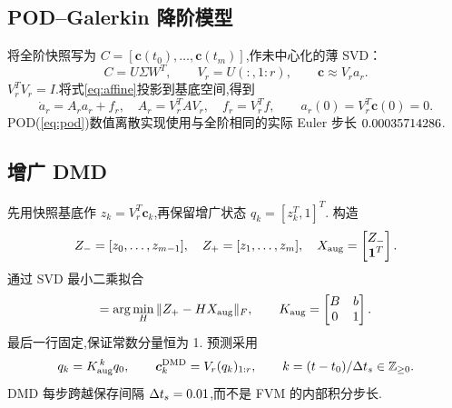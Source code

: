 \documentclass[UTF8,a4paper,11pt,fontset=fandol]{ctexart}
\makeatletter
\numberwithin{equation}{section}
\let\TableInput\@@input
\newcommand{\cc}{\bm{c}}
\makeatother
\begin{document}
\subsection{POD--Galerkin 降阶模型}
将全阶快照写为 $C=[\cc(t_0),\ldots,\cc(t_m)]$,作未中心化的薄 SVD：
\begin{equation}
 C=U\Sigma W^T,\qquad V_r=U(:,1:r),\qquad \cc\approx V_r a_r.
\end{equation}
$V_r^TV_r=I$.将式\eqref{eq:affine}投影到基底空间,得到
\begin{equation}\label{eq:pod}
 \dot a_r=A_r a_r+f_r,\quad A_r=V_r^TAV_r,\quad f_r=V_r^Tf,
 \qquad a_r(0)=V_r^T\cc(0)=0.
\end{equation}
POD(\ref{eq:pod})数值离散实现使用与全阶相同的实际 Euler 步长 $0.00035714286$.


\subsection{增广 DMD}
先用快照基底作 $z_k=V_r^T\cc_k$,再保留增广状态
$q_k=[z_k^T,1]^T$.
构造
\begin{equation}
 Z_-=[z_0,\ldots,z_{m-1}],\quad Z_+=[z_1,\ldots,z_m],\quad
 X_{\rm aug}=\begin{bmatrix}Z_-\\\bm{1}^T\end{bmatrix}.
\end{equation}
通过 SVD 最小二乘拟合
\begin{equation}
 [B\ b]=\arg\min_H\|Z_+-HX_{\rm aug}\|_F,
 \qquad K_{\rm aug}=\begin{bmatrix}B&b\\0&1\end{bmatrix}.
\end{equation}
最后一行固定,保证常数分量恒为 1.
预测采用
\begin{equation}
 q_k=K_{\rm aug}^{\,k}q_0,\qquad
 \cc_k^{\rm DMD}=V_r(q_k)_{1:r},\qquad
 k=(t-t_0)/\Delta t_s\in\mathbb{Z}_{\geq0}.
\end{equation}
DMD 每步跨越保存间隔 $\Delta t_s=0.01$,而不是 FVM 的内部积分步长.
\end{document}

